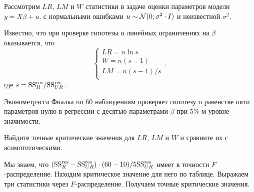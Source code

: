 \begin{problem}
Рассмотрим $LR$, $LM$ и $W$ статистики в задаче оценки параметров модели $y=X\beta + u$, с нормальными ошибками $u\sim \mathcal{N}(0;\sigma^2 \cdot I)$ и неизвестной $\sigma^2$.

Известно, что при проверке гипотезы о линейных ограничениях на $\beta$ оказывается, что
\[
\begin{cases}
   LR = n \ln s \\
   W = n (s - 1) \\
   LM = n(s-1)/s \\
\end{cases},
\]
где $s = \mathrm{SS}^{\text{res}}_R / \mathrm{SS}^{\text{res}}_{UR}$.

Эконометрэсса Фиалка по 60 наблюдениям проверяет гипотезу о равенстве пяти параметров нулю
в регрессии с десятью параметрами $\beta$ при 5\%-м уровне значимости.

Найдите точные критические значения для $LR$, $LM$ и $W$ и сравните их с асимптотическими.

  \begin{sol}
      Мы знаем, что $(\mathrm{SS}^{\text{res}}_R - \mathrm{SS}^{\text{res}}_{UR}) \cdot (60 - 10) / 5 \mathrm{SS}^{\text{res}}_{UR}$ имеет в точности $F$-распределение.
      Находим критическое значение для него по таблице. Выражаем три статистики через $F$-распределение.
      Получаем точные критические значения.
  \end{sol}
\end{problem}







\section{}


